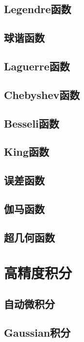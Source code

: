 \subsection{Legendre函数}

\subsection{球谐函数}

\subsection{Laguerre函数}

\subsection{Chebyshev函数}

\subsection{Besseli函数}

\subsection{King函数}

\subsection{误差函数}

\subsection{伽马函数}

\subsection{超几何函数}


\section{高精度积分}

\subsection{自动微积分}
\subsection{Gaussian积分}
